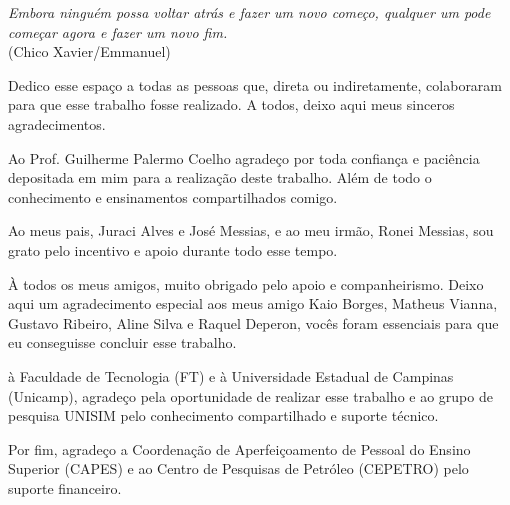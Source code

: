 \documentclass[Portugues,Final]{tese-FT}
\begin{document}
        \paginasiniciais
        
         \begin{epigrafe}
        {\it
                Embora ninguém possa voltar atrás e fazer um novo começo, 
                qualquer um pode começar agora e fazer um novo fim.\\
        }
        \hfill (Chico Xavier/Emmanuel)
        \end{epigrafe}
        Dedico esse espaço a todas as pessoas que, direta ou indiretamente, colaboraram para que esse trabalho fosse realizado. A todos, deixo aqui meus sinceros agradecimentos.
        \newline
        \par
        Ao Prof. Guilherme Palermo Coelho agradeço por toda confiança e paciência depositada em mim para a realização deste trabalho. Além de todo o conhecimento e ensinamentos compartilhados comigo.
        \newline
        \par
        Ao meus pais, Juraci Alves e José Messias, e ao meu irmão, Ronei Messias, sou grato pelo incentivo e apoio durante todo esse tempo.
        \newline
        \par
        À todos os meus amigos, muito obrigado pelo apoio e companheirismo. Deixo aqui um agradecimento especial aos meus amigo Kaio Borges, Matheus Vianna, Gustavo Ribeiro, Aline Silva e Raquel Deperon, vocês foram essenciais para que eu conseguisse concluir esse trabalho.
        \newline
        \par
        à Faculdade de Tecnologia (FT) e à Universidade Estadual de Campinas (Unicamp), agradeço pela oportunidade de realizar esse trabalho e ao grupo de pesquisa UNISIM pelo conhecimento compartilhado e suporte técnico.
        \newline
        \par
        Por fim, agradeço a Coordenação de Aperfeiçoamento de Pessoal do Ensino Superior (CAPES) e ao Centro de Pesquisas de Petróleo (CEPETRO) pelo suporte financeiro.
\end{document}
